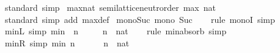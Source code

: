 \begin{isabellebody}
\isamarkupfalse%
\ standard\ simp%
\endisatagproof
{\isafoldproof}%
%
\isadelimproof
\isanewline
%
\endisadelimproof
\isanewline
{}\isamarkupfalse%
\ max{\isacharunderscore}{\kern0pt}nat{\isacharcolon}{\kern0pt}\ semilattice{\isacharunderscore}{\kern0pt}neutr{\isacharunderscore}{\kern0pt}order\ max\ {\isacartoucheopen}{}{\isacharcolon}{\kern0pt}{\isacharcolon}{\kern0pt}nat{\isacartoucheclose}\ {\isacartoucheopen}{\isacharparenleft}{\kern0pt}{\isasymge}{\isacharparenright}{\kern0pt}{\isacartoucheclose}\ {\isacartoucheopen}{\isacharparenleft}{\kern0pt}{\isachargreater}{\kern0pt}{\isacharparenright}{\kern0pt}{\isacartoucheclose}\isanewline
%
\isadelimproof
\ \ %
\endisadelimproof
%
\isatagproof
{}\isamarkupfalse%
\ standard\ {\isacharparenleft}{\kern0pt}simp\ add{\isacharcolon}{\kern0pt}\ max{\isacharunderscore}{\kern0pt}def{\isacharparenright}{\kern0pt}%
\endisatagproof
{\isafoldproof}%
%
\isadelimproof
\isanewline
%
\endisadelimproof
\isanewline
{}\isamarkupfalse%
\ mono{\isacharunderscore}{\kern0pt}Suc{\isacharcolon}{\kern0pt}\ {\isachardoublequoteopen}mono\ Suc{\isachardoublequoteclose}\isanewline
%
\isadelimproof
\ \ %
\endisadelimproof
%
\isatagproof
{}\isamarkupfalse%
\ {\isacharparenleft}{\kern0pt}rule\ monoI{\isacharparenright}{\kern0pt}\ simp%
\endisatagproof
{\isafoldproof}%
%
\isadelimproof
\isanewline
%
\endisadelimproof
\isanewline
{}\isamarkupfalse%
\ min{\isacharunderscore}{\kern0pt}{}L\ {\isacharbrackleft}{\kern0pt}simp{\isacharbrackright}{\kern0pt}{\isacharcolon}{\kern0pt}\ {\isachardoublequoteopen}min\ {}\ n\ {\isacharequal}{\kern0pt}\ {}{\isachardoublequoteclose}\isanewline
\ \ \ n\ {\isacharcolon}{\kern0pt}{\isacharcolon}{\kern0pt}\ nat\isanewline
%
\isadelimproof
\ \ %
\endisadelimproof
%
\isatagproof
{}\isamarkupfalse%
\ {\isacharparenleft}{\kern0pt}rule\ min{\isacharunderscore}{\kern0pt}absorb{}{\isacharparenright}{\kern0pt}\ simp%
\endisatagproof
{\isafoldproof}%
%
\isadelimproof
\isanewline
%
\endisadelimproof
\isanewline
{}\isamarkupfalse%
\ min{\isacharunderscore}{\kern0pt}{}R\ {\isacharbrackleft}{\kern0pt}simp{\isacharbrackright}{\kern0pt}{\isacharcolon}{\kern0pt}\ {\isachardoublequoteopen}min\ n\ {}\ {\isacharequal}{\kern0pt}\ {}{\isachardoublequoteclose}\isanewline
\ \ \ n\ {\isacharcolon}{\kern0pt}{\isacharcolon}{\kern0pt}\ nat\isanewline
%

\end{isabellebody}
